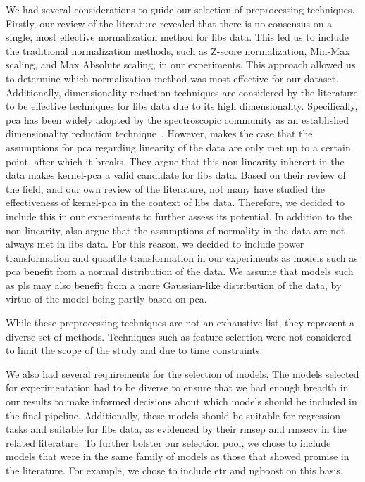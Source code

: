 We had several considerations to guide our selection of preprocessing techniques.
Firstly, our review of the literature revealed that there is no consensus on a single, most effective normalization method for \gls{libs} data.
This led us to include the traditional normalization methods, such as Z-score normalization, Min-Max scaling, and Max Absolute scaling, in our experiments.
This approach allowed us to determine which normalization method was most effective for our dataset. 
Additionally, dimensionality reduction techniques are considered by the literature to be effective techniques for \gls{libs} data due to its high dimensionality. Specifically, \gls{pca} has been widely adopted by the spectroscopic community as an established dimensionality reduction technique~\cite{pca_review_paper}. However, \citet{pca_review_paper} makes the case that the assumptions for \gls{pca} regarding linearity of the data are only met up to a certain point, after which it breaks. They argue that this non-linearity inherent in the data makes \gls{kernel-pca} a valid candidate for \gls{libs} data. Based on their review of the field, and our own review of the literature, not many have studied the effectiveness of \gls{kernel-pca} in the context of \gls{libs} data. Therefore, we decided to include this in our experiments to further assess its potential. In addition to the non-linearity, \citet{pca_review_paper} also argue that the assumptions of normality in the data are not always met in \gls{libs} data. For this reason, we decided to include power transformation and quantile transformation in our experiments as models such as \gls{pca} benefit from a normal distribution of the data. We assume that models such as \gls{pls} may also benefit from a more Gaussian-like distribution of the data, by virtue of the model being partly based on \gls{pca}.

While these preprocessing techniques are not an exhaustive list, they represent a diverse set of methods.
Techniques such as feature selection were not considered to limit the scope of the study and due to time constraints.

We also had several requirements for the selection of models.
The models selected for experimentation had to be diverse to ensure that we had enough breadth in our results to make informed decisions about which models should be included in the final pipeline.
Additionally, these models should be suitable for regression tasks and suitable for \gls{libs} data, as evidenced by their \gls{rmsep} and \gls{rmsecv} in the related literature.
To further bolster our selection pool, we chose to include models that were in the same family of models as those that showed promise in the literature.
For example, we chose to include \gls{etr} and \gls{ngboost} on this basis.

